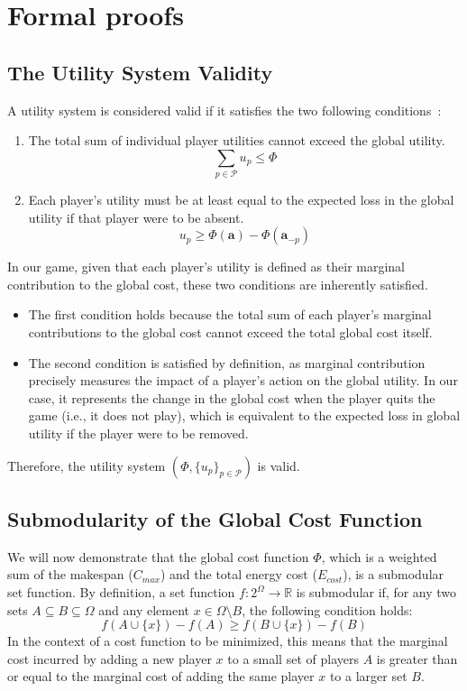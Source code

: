 \documentclass[preprint, 3p, review, 12pt]{elsarticle}
\begin{document}
 


\appendix
\section{Formal proofs}
\label{proofs}

\subsection{The Utility System Validity}
A utility system is considered valid if it satisfies the two following conditions~\cite{1181966}: 
\begin{enumerate}
    \item The total sum of individual player utilities cannot exceed the global utility.
    $$ \sum_{p \in \mathcal{P}} u_p \le \Phi $$
    \item Each player's utility must be at least equal to the expected loss in the global utility if that player were to be absent.
    $$ u_p \ge \Phi(\mathbf{a}) - \Phi(\mathbf{a}_{-p}) $$
\end{enumerate}

In our game, given that each player's utility is defined as their marginal contribution to the global cost, these two conditions are inherently satisfied.

\begin{itemize}
    \item The first condition holds because the total sum of each player's marginal contributions to the global cost cannot exceed the total global cost itself.
    \item The second condition is satisfied by definition, as marginal contribution precisely measures the impact of a player's action on the global utility. In our case, it represents the change in the global cost when the player quits the game (i.e., it does not play), which is equivalent to the expected loss in global utility if the player were to be removed.
\end{itemize}

Therefore, the utility system $(\Phi,\{u_p\}_{p \in \mathcal{P}})$ is valid.

\subsection{Submodularity of the Global Cost Function}

We will now demonstrate that the global cost function $\Phi$, which is a weighted sum of the makespan ($C_{max}$) and the total energy cost ($E_{cost}$), is a submodular set function. By definition, a set function $f: 2^\Omega \to \mathbb{R}$ is submodular if, for any two sets $A \subseteq B \subseteq \Omega$ and any element $x \in \Omega \setminus B$, the following condition holds:
\begin{equation*}
f(A \cup \{x\}) - f(A) \ge f(B \cup \{x\}) - f(B)
\end{equation*}
In the context of a cost function to be minimized, this means that the marginal cost incurred by adding a new player $x$ to a small set of players $A$ is greater than or equal to the marginal cost of adding the same player $x$ to a larger set $B$.
\end{document}
